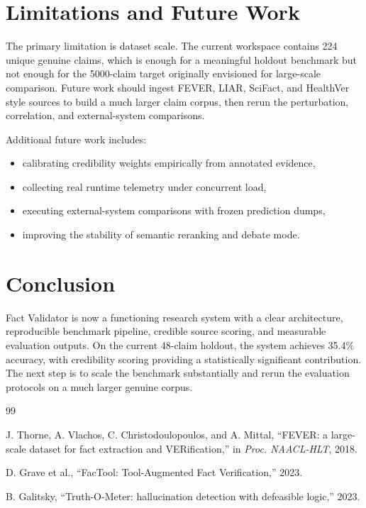 \documentclass[conference]{IEEEtran}
\begin{document}
\section{Limitations and Future Work}
The primary limitation is dataset scale. The current workspace contains 224 unique genuine claims, which is enough for a meaningful holdout benchmark but not enough for the 5000-claim target originally envisioned for large-scale comparison. Future work should ingest FEVER, LIAR, SciFact, and HealthVer style sources to build a much larger claim corpus, then rerun the perturbation, correlation, and external-system comparisons.

Additional future work includes:
\begin{itemize}
  \item calibrating credibility weights empirically from annotated evidence,
  \item collecting real runtime telemetry under concurrent load,
  \item executing external-system comparisons with frozen prediction dumps,
  \item improving the stability of semantic reranking and debate mode.
\end{itemize}

\section{Conclusion}
Fact Validator is now a functioning research system with a clear architecture, reproducible benchmark pipeline, credible source scoring, and measurable evaluation outputs. On the current 48-claim holdout, the system achieves 35.4\% accuracy, with credibility scoring providing a statistically significant contribution. The next step is to scale the benchmark substantially and rerun the evaluation protocols on a much larger genuine corpus.

\begin{thebibliography}{99}

J. Thorne, A. Vlachos, C. Christodoulopoulos, and A. Mittal, ``FEVER: a large-scale dataset for fact extraction and VERification,'' in \emph{Proc. NAACL-HLT}, 2018.

D. Grave et al., ``FacTool: Tool-Augmented Fact Verification,'' 2023.

B. Galitsky, ``Truth-O-Meter: hallucination detection with defeasible logic,'' 2023.

\end{thebibliography}
\end{document}
